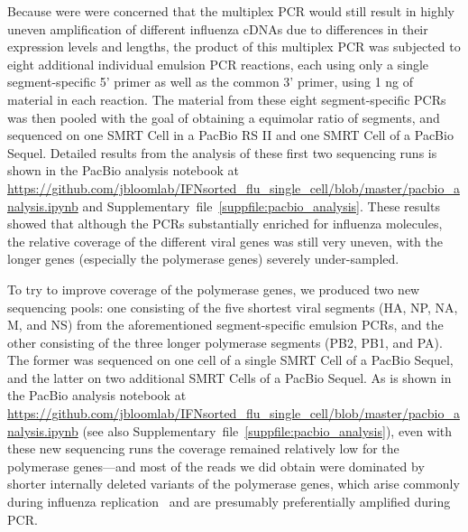\documentclass[9pt,lineno]{elife}
\begin{document}
Because were were concerned that the multiplex PCR would still result in highly uneven amplification of different influenza cDNAs due to differences in their expression levels and lengths, the product of this multiplex PCR was subjected to eight additional individual emulsion PCR reactions, each using only a single segment-specific 5' primer as well as the common 3' primer, using 1 ng of material in each reaction.
The material from these eight segment-specific PCRs was then pooled with the goal of obtaining a equimolar ratio of segments, and sequenced on one SMRT Cell in a PacBio RS II and one SMRT Cell of a PacBio Sequel. 
Detailed results from the analysis of these first two sequencing runs is shown in the PacBio analysis notebook at \url{https://github.com/jbloomlab/IFNsorted_flu_single_cell/blob/master/pacbio_analysis.ipynb} and Supplementary~file~\ref{suppfile:pacbio_analysis}.
These results showed that although the PCRs substantially enriched for influenza molecules, the relative coverage of the different viral genes was still very uneven, with the longer genes (especially the polymerase genes) severely under-sampled.

To try to improve coverage of the polymerase genes, we produced two new sequencing pools: one consisting of the five shortest viral segments (HA, NP, NA, M, and NS) from the aforementioned segment-specific emulsion PCRs, and the other consisting of the three longer polymerase segments (PB2, PB1, and PA).
The former was sequenced on one cell of a single SMRT Cell of a PacBio Sequel, and the latter on two additional SMRT Cells of a PacBio Sequel. 
As is shown in the PacBio analysis notebook at \url{https://github.com/jbloomlab/IFNsorted_flu_single_cell/blob/master/pacbio_analysis.ipynb} (see also Supplementary~file~\ref{suppfile:pacbio_analysis}), even with these new sequencing runs the coverage remained relatively low for the polymerase genes---and most of the reads we did obtain were dominated by shorter internally deleted variants of the polymerase genes, which arise commonly during influenza replication~\citep{xue2016propagation} and are presumably preferentially amplified during PCR.
\end{document}
